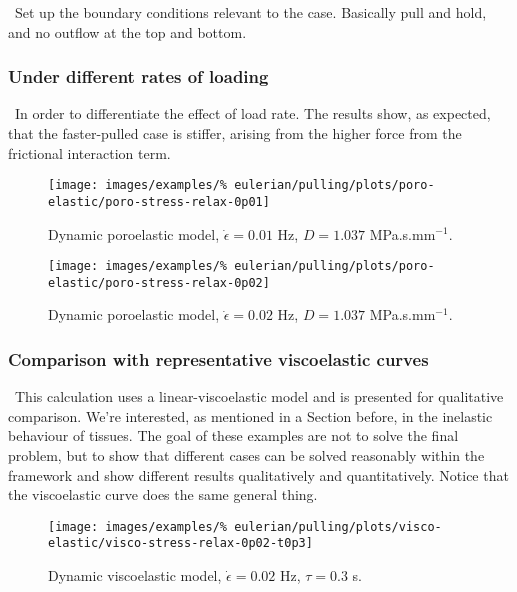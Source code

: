\textbullet\ Set up the boundary conditions relevant to the
case. Basically pull and hold, and no outflow at the top and
bottom.

\subsubsection{Under different rates of loading}
\label{modifying-load-rates}

\textbullet\ In order to differentiate the effect of load rate. The
results show, as expected, that the faster-pulled case is stiffer,
arising from the higher force from the frictional interaction term.

\begin{figure}[!hptb]
\centering
\texttt{[image: images/examples/\%
eulerian/pulling/plots/poro-elastic/poro-stress-relax-0p01]}
\caption{Dynamic poroelastic model, $\dot{\epsilon}=0.01$ Hz, $D=1.037$
  MPa.s.mm$^{-1}$.}
\label{poro-stress-relax-0p01}
\end{figure}

\begin{figure}[!hptb]
\centering
\texttt{[image: images/examples/\%
eulerian/pulling/plots/poro-elastic/poro-stress-relax-0p02]}
\caption{Dynamic poroelastic model, $\dot{\epsilon}=0.02$ Hz, $D=1.037$
  MPa.s.mm$^{-1}$.}
\label{poro-stress-relax-0p02}
\end{figure}

\subsubsection{Comparison with representative viscoelastic curves}
\label{viscoelastic-stress-relaxation}

\textbullet\ This calculation uses a linear-viscoelastic model and is
presented for qualitative comparison. We're interested, as mentioned
in a Section before, in the inelastic behaviour of tissues. The goal
of these examples are not to solve the final problem, but to show that
different cases can be solved reasonably within the framework and show
different results qualitatively and quantitatively. Notice that the
viscoelastic curve does the same general thing.

\begin{figure}[!hptb]
\centering
\texttt{[image: images/examples/\%
eulerian/pulling/plots/visco-elastic/visco-stress-relax-0p02-t0p3]}
\caption{Dynamic viscoelastic model, $\dot{\epsilon}=0.02$ Hz,
  $\tau=0.3$ s.}
\label{visco-stress-relax-0p02-t0p3}
\end{figure}

